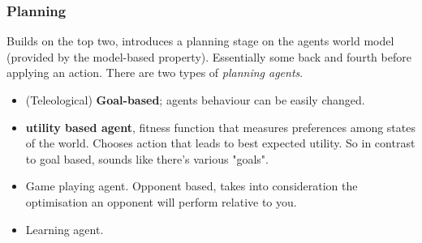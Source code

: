 \documentclass{article}
\begin{document}
\subsubsection{Planning}
Builds on the top two, introduces a planning stage on the agents world model (provided by the model-based property). Essentially some back and fourth before applying an action. There are two types of \emph{planning agents}.

\begin{itemize}
	\item (Teleological) \textbf{Goal-based}; agents behaviour can be easily changed.
	\item \textbf{utility based agent}, fitness function that measures preferences among states of the world. Chooses action that leads to best expected utility. So in contrast to goal based, sounds like there's various "goals".
	\item Game playing agent. Opponent based, takes into consideration the optimisation an opponent will perform relative to you.
	\item Learning agent.
\end{itemize}
\end{document}
